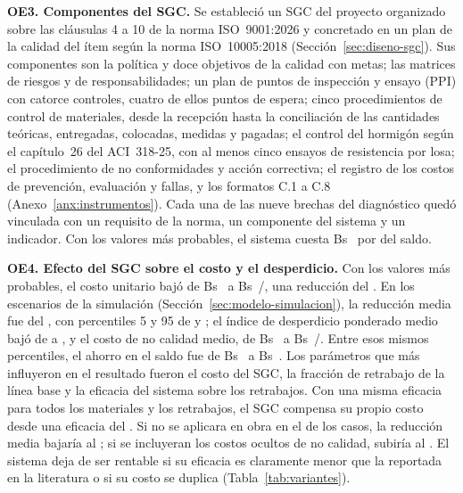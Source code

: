 \textbf{OE3. Componentes del SGC.} Se estableció un SGC del proyecto organizado sobre las cláusulas 4 a 10 de la norma ISO~9001:2026 y concretado en un plan de la calidad del ítem según la norma ISO~10005:2018 (Sección~\ref{sec:diseno-sgc}). Sus componentes son la política y doce objetivos de la calidad con metas; las matrices de riesgos y de responsabilidades; un plan de puntos de inspección y ensayo (PPI) con catorce controles, cuatro de ellos puntos de espera; cinco procedimientos de control de materiales, desde la recepción hasta la conciliación de las cantidades teóricas, entregadas, colocadas, medidas y pagadas; el control del hormigón según el capítulo~26 del ACI~318-25, con al menos cinco ensayos de resistencia por losa; el procedimiento de no conformidades y acción correctiva; el registro de los costos de prevención, evaluación y fallas, y los formatos C.1 a C.8 (Anexo~\ref{anx:instrumentos}). Cada una de las nueve brechas del diagnóstico quedó vinculada con un requisito de la norma, un componente del sistema y un indicador. Con los valores más probables, el sistema cuesta Bs~\CCconDet{} por \mdos{} del saldo.

\textbf{OE4. Efecto del SGC sobre el costo y el desperdicio.} Con los valores más probables, el costo unitario bajó de Bs~\CUsinDet{} a Bs~\CUconDet/\mdos{}, una reducción del \rDet{}. En los \MCiter{} escenarios de la simulación (Sección~\ref{sec:modelo-simulacion}), la reducción media fue del \rMedia{}, con percentiles 5 y 95 de \rPcinco{} y \rPnoventaycinco{}; el índice de desperdicio ponderado medio bajó de \IDMsinMedia{} a \IDMconMedia{}, y el costo de no calidad medio, de Bs~\CNCsinMedia{} a Bs~\CNCconMedia/\mdos{}. Entre esos mismos percentiles, el ahorro en el saldo fue de Bs~\AhorroPcinco{} a Bs~\AhorroPnoventaycinco{}. Los parámetros que más influyeron en el resultado fueron el costo del SGC, la fracción de retrabajo de la línea base y la eficacia del sistema sobre los retrabajos. Con una misma eficacia para todos los materiales y los retrabajos, el SGC compensa su propio costo desde una eficacia del \KequilibrioCero{}. Si no se aplicara en obra en el \PiFalla{} de los casos, la reducción media bajaría al \rMediaFalla{}; si se incluyeran los costos ocultos de no calidad, subiría al \rMediaOcultos{}. El sistema deja de ser rentable si su eficacia es claramente menor que la reportada en la literatura o si su costo se duplica (Tabla~\ref{tab:variantes}).

